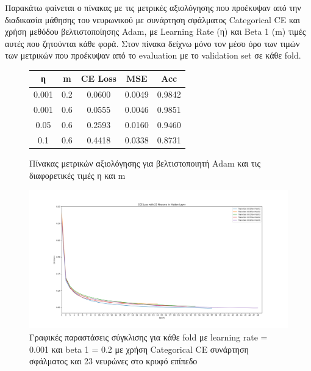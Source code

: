 \documentclass[12pt,a4paper]{article}
\begin{document}
Παρακάτω φαίνεται ο πίνακας με τις μετρικές αξιολόγησης που προέκυψαν από την διαδικασία μάθησης του νευρωνικού με συνάρτηση σφάλματος Categorical CE και χρήση μεθόδου βελτιστοποίησης Adam, με Learning Rate (η) και Beta 1 (m) τιμές αυτές που ζητούνται κάθε φορά. Στον πίνακα δείχνω μόνο τον μέσο όρο των τιμών των μετρικών που προέκυψαν από το evaluation με το validation set σε κάθε fold.

\begin{figure}[H]
    \begin{center}
    \begin{tabular}{ |c|c|c|c|c| } 
        \hline
        \textbf{η} & \textbf{m} & \textbf{CE Loss} & \textbf{MSE} & \textbf{Acc} \\ \hline
        0.001 & 0.2 & 0.0600 & 0.0049 & 0.9842 \\
        \hline
        0.001 & 0.6 & 0.0555 & 0.0046 & 0.9851 \\
        \hline
        0.05  & 0.6 & 0.2593 & 0.0160 & 0.9460 \\ 
        \hline
        0.1   & 0.6 & 0.4418 & 0.0338 & 0.8731 \\ 
        \hline
    \end{tabular}
    \end{center}
    \caption{Πίνακας μετρικών αξιολόγησης για βελτιστοποιητή Adam και τις διαφορετικές τιμές η και m}
\end{figure}

\begin{figure}[H]
	\includegraphics[width=\textwidth]{Screenshots/24. LR 0.001 - Beta1 0.2.png}
	\caption{Γραφικές παραστάσεις σύγκλισης για κάθε fold με learning rate = 0.001 και beta 1 = 0.2 με χρήση Categorical CE συνάρτηση σφάλματος και 23 νευρώνες στο κρυφό επίπεδο}
\end{figure}
\end{document}
